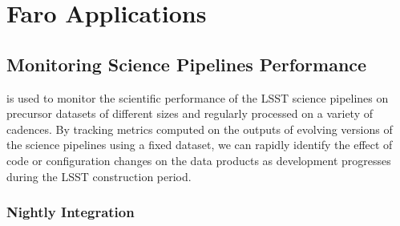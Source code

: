 \section{Faro Applications} \label{sec:applications}

\subsection{Monitoring Science Pipelines Performance} \label{ssec:monitoring}

\faro is used to monitor the scientific performance of the LSST science pipelines on precursor datasets of different sizes and regularly processed on a variety of cadences\cite{dmtn-091}.
By tracking metrics computed on the outputs of evolving versions of the science pipelines using a fixed dataset, we can rapidly identify the effect of code or configuration changes on the data products as development progresses during the LSST construction period.

\subsubsection{Nightly Integration}\label{sssec:ci}

